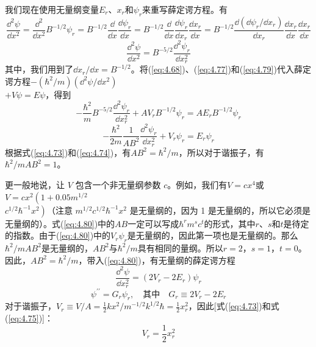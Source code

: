     我们现在使用无量纲变量$E_r$、$x_r$和$\psi_r$来重写薛定谔方程。有
    \begin{equation*}
        \frac{\dd ^2\psi}{\dd x^2} = \frac{\dd ^2}{\dd x^2}B^{-1/2}\psi_r = B^{-1/2}\frac{\dd }{\dd x}\frac{\dd \psi_r}{\dd x} = B^{-1/2}\frac{\dd }{\dd x}\frac{\dd \psi_r}{\dd x_r}\frac{\dd x_r}{\dd x} = B^{-1/2}\frac{\dd \left(\dd \psi_r/\dd x_r\right)}{\dd x_r}\frac{\dd x_r}{\dd x}\frac{\dd x_r}{\dd x}
    \end{equation*}
    \begin{equation}
        \frac{\dd ^2\psi}{\dd x^2} = B^{-5/2}\frac{\dd ^2\psi_r}{\dd x_r^2}
        \label{eq:4.79}
    \end{equation}
    其中，我们用到了$\dd x_r/\dd x = B^{-1/2}$。将(\ref{eq:4.68})、(\ref{eq:4.77})和(\ref{eq:4.79})代入薛定谔方程$-\left(\hbar^2/m\right)\left(\dd ^2\psi/\dd x^2\right) $\\$+ V\psi = E\psi$，得到
    \begin{equation*}
        -\frac{\hbar^2}{m}B^{-5/2}\frac{\dd ^2\psi_r}{\dd x_r^2} + AV_rB^{-1/2}\psi_r = AE_rB^{-1/2}\psi_r
    \end{equation*}
    \begin{equation}
        -\frac{\hbar^2}{2m}\frac{1}{AB^2}\frac{\dd ^2\psi_r}{\dd x_r^2} + V_r\psi_r = E_r\psi_r
        \label{eq:4.80}
    \end{equation}
    根据式(\ref{eq:4.73})和(\ref{eq:4.74})，有$AB^2 = \hbar^2/m$，所以对于谐振子，有$\hbar^2/mAB^2 = 1$。

    更一般地说，让 $V$ 包含一个非无量纲参数 $c$。例如，我们有$V = cx^4$或$V = cx^2\left(1+0.05m^{1/2}\right.$\\$\left.c^{1/2}\hbar^{-1}x^2\right)$（注意 $m^{1/2}c^{1/2}\hbar^{-1}x^2$ 是无量纲的，因为 1 是无量纲的，所以它必须是无量纲的）。式(\ref{eq:4.80})中的$AB$一定可以写成$\hbar^rm^sc^t$的形式，其中$r$、$s$和$t$是待定的指数。由于(\ref{eq:4.80})中的$V_r\psi_r$是无量纲的，因此第一项也是无量纲的。那么$\hbar^2/mAB^2$是无量纲的，$AB^2$与$\hbar^2/m$具有相同的量纲。所以$r=2$，$s=1$，$t=0$。因此，$AB^2 = \hbar^2/m$，带入(\ref{eq:4.80})，有无量纲的薛定谔方程
    \begin{equation}
        \frac{\dd ^2\psi}{\dd x_r^2} = \left(2V_r-2E_r\right)\psi_r
        \label{eq:4.81}
    \end{equation}
    \begin{equation}
        \psi^{\prime\prime} = G_r\psi_r, \quad \text{其中} \quad G_r \equiv 2V_r-2E_r
        \label{eq:4.82}
    \end{equation}
    对于谐振子，$V_r \equiv V/A = \frac{1}{2}kx^2/m^{-1/2}k^{1/2}\hbar = \frac{1}{2}x_r^2$，因此[式(\ref{eq:4.73})和式(\ref{eq:4.75})]：
    \begin{equation}
        V_r = \frac{1}{2}x_r^2
        \label{eq:4.83}
    \end{equation}

